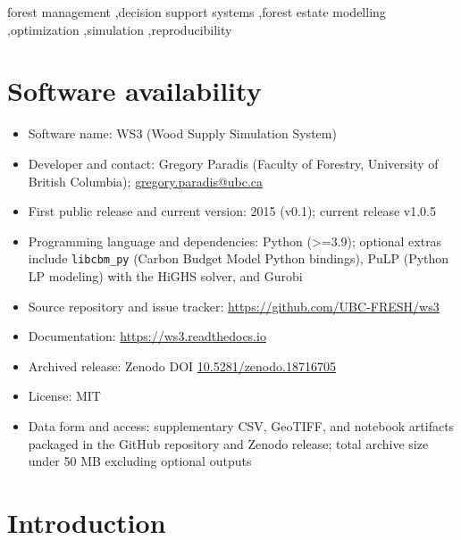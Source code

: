 \documentclass[review]{elsarticle}
\begin{document}
\begin{frontmatter}
\begin{keyword}
forest management \sep decision support systems \sep forest estate modelling \sep optimization \sep simulation \sep reproducibility
\end{keyword}

\section*{Software availability}
\begin{itemize}
  \item Software name: WS3 (Wood Supply Simulation System)
  \item Developer and contact: Gregory Paradis (Faculty of Forestry, University of British Columbia); \href{mailto:gregory.paradis@ubc.ca}{gregory.paradis@ubc.ca}
  \item First public release and current version: 2015 (v0.1); current release v1.0.5
  \item Programming language and dependencies: Python (>=3.9); optional extras include \texttt{libcbm\_py} (Carbon Budget Model Python bindings), PuLP (Python LP modeling) with the HiGHS solver, and Gurobi
  \item Source repository and issue tracker: \url{https://github.com/UBC-FRESH/ws3}
  \item Documentation: \url{https://ws3.readthedocs.io}
  \item Archived release: Zenodo DOI \href{https://doi.org/10.5281/zenodo.18716705}{10.5281/zenodo.18716705}
  \item License: MIT
  \item Data form and access: supplementary CSV, GeoTIFF, and notebook artifacts packaged in the GitHub repository and Zenodo release; total archive size under 50 MB excluding optional outputs
\end{itemize}

\end{frontmatter}

\clearpage

\linenumbers

\section{Introduction}
\end{document}

